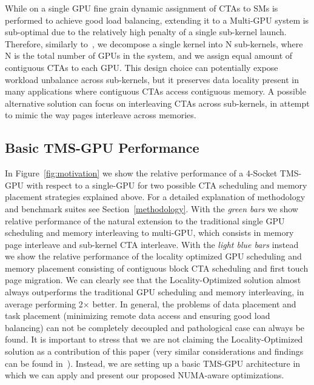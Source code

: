 While on a single GPU fine grain dynamic assignment of CTAs to SMs is performed
to achieve good load balancing, extending it to a Multi-GPU system is
sub-optimal due to the relatively high penalty of a single sub-kernel launch.
Therefore, similarly to~\cite{Cabezas2015}, we decompose a single kernel into N
sub-kernels, where N is the total number of GPUs in the system, and we assign
equal amount of contiguous CTAs to each GPU.  This design choice can potentially
expose workload unbalance across sub-kernels, but it preserves data locality
present in many applications where contiguous CTAs access contiguous memory. A
possible alternative solution can focus on interleaving CTAs across
sub-kernels, in attempt to mimic the way pages interleave across memories. 

\subsection{Basic TMS-GPU Performance}
In Figure~\ref{fig:motivation} we show the relative performance of a 4-Socket
TMS-GPU with respect to a single-GPU for two possible CTA scheduling and memory
placement strategies explained above. For a detailed explanation of methodology
and benchmark suites see Section~\ref{methodology}. With the \emph{green bars}
we show relative performance of the natural extension to the traditional single
GPU scheduling and memory interleaving to multi-GPU, which consists in memory
page interleave and sub-kernel CTA interleave. With the \emph{light blue bars}
instead we show the relative performance of the locality optimized GPU
scheduling and memory placement consisting of contiguous block CTA scheduling
and first touch page migration. We can clearly see that the Locality-Optimized
solution almost always outperforms the traditional GPU scheduling and memory
interleaving, in average performing 2$\times$ better. In general, the problems of data
placement and task placement (minimizing remote data access and ensuring good
load balancing) can not be completely decoupled and pathological case can
always be found. It is important to stress that we are not claiming the
Locality-Optimized solution as a contribution of this paper (very
similar considerations and findings can be found
in~\cite{Cabezas2015, Arunkumar2017}). Instead, we are setting up a basic TMS-GPU
architecture in which we can apply and present our proposed NUMA-aware optimizations.

